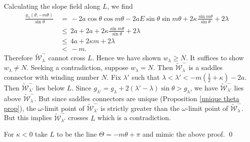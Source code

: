 \documentclass[11 pt]{article}
\renewcommand\l{\lambda}
\renewcommand\({\left(}
\renewcommand\){\right)}
\newcommand\wt{\widetilde}
\newcommand\<{\langle}
\renewcommand\>{\rangle}
\renewcommand\l{\lambda}
\newcommand\8{\infty}
\newcommand{\mc}{\mathcal}
\begin{document}
Calculating the slope field along $L$, we find
\begin{align*}
\frac{g_\l(\theta, -m\theta)}{\sin \theta} \,&=\, -2a \cos\theta \cos m\theta - 2aE \sin \theta \sin m\theta + 2\kappa\frac{\sin m\theta}{\sin \theta} + 2\lambda      
\\
&\leq\, 2a + 2a + 2\kappa\frac{\sin m\theta }{\sin \theta} + 2\l
\\
&\leq\, 4a + 2\kappa m + 2\l
\\
&<\, -m.
\end{align*}
Therefore $\wt{\mc{W}}^-_\l$ cannot cross $L$. Hence we have shown $w_\l \geq N$. It suffices to show $w_\l \neq N$. Seeking a contradiction, suppose $w_\l = N$. Then $\wt{\mc{W}}^-_\l$ is a saddles connector with winding number $N$. Fix $\l'$ such that $\l < \l' < -m(\frac{1}{2} + \kappa) -2a$. Then $\wt{\mc{W}}^-_{\l'}$ lies below $L$. Since $g_{\l'} = g_\l + 2(\l' - \l)\sin \theta > g_\l$, we have $\wt{\mc{W}}^-_{\l'}$ lies above $\wt{\mc{W}}^-_\l$. But since saddles connectors are unique (Proposition \ref{unique theta prop}), the $\omega$-limit point of $\wt{\mc{W}}^-_{\l'}$ is strictly greater than the $\omega$-limit point of $\wt{\mc{W}}^-_{\l}$. But this implies $\wt{\mc{W}}^-_{\l'}$ crosses $L$ which is a contradiction.

For $\kappa < 0$ take $L$ to be the line $\Theta = -m\theta + \pi$ and mimic the above proof. 
\qed
\end{document}
